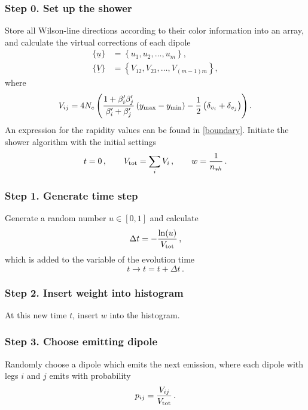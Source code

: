 \documentclass[11pt,a4paper]{article}
\begin{document}
\subsubsection*{Step 0. Set up the shower}
Store all Wilson-line directions according to their color information into an array, and calculate the virtual corrections of each dipole
\begin{align}
\{\underline{u}\}&=\left\{u_1,u_2,\dots,u_m\right\} ,\nonumber\\
\{\underline{V}\}&=\left\{V_{12},V_{23},\dots,V_{(m-1)m}\right\} ,\label{eq:initialVrecipe}
\end{align} 
where
\begin{equation}
V_{ij}= 4 N_c \left(
\frac{1 + \beta^\prime_i \beta^\prime_{j}}{\beta^\prime_i + \beta^\prime_{j} }\left(y_{\rm max}-y_{\rm min}\right) -\frac{1}{2}\left(\delta_{v_i}+\delta_{v_{j}}\right)\right).
\end{equation}
An expression for the rapidity values can be found in \eqref{boundary}. Initiate the shower algorithm with the initial settings
\begin{equation}
t=0 \, ,\qquad V_{{\rm tot}}=\sum_i V_i \, , \qquad w=\frac{1}{n_{sh}} \, . \label{eq:initialValuesRecipe}
\end{equation}

\subsubsection*{Step 1. Generate time step}
Generate a random number $u\in[0,1]$ and calculate 
\begin{equation}
\Delta t = -\frac{\ln(u)}{ V_{{\rm tot}}} \, ,
\end{equation}
which is added to the variable of the evolution time
\begin{equation}
t \rightarrow t=t+\Delta t \, .
\end{equation}

\subsubsection*{Step 2. Insert weight into histogram}
At this new time $t$, insert $w$ into the histogram.

\subsubsection*{Step 3. Choose emitting dipole}
Randomly choose a dipole which emits the next emission, where each dipole with legs $i$ and $j$ emits with probability 
\begin{align}
p_{ij}=\frac{V_{ij}}{V_{{\rm tot}}} \, .
\end{align}
\end{document}

